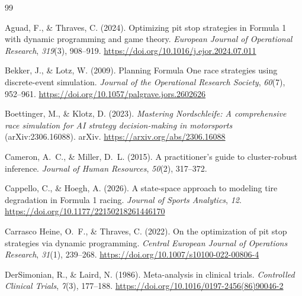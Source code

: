 \begin{thebibliography}{99}


Aguad, F., \& Thraves, C. (2024). Optimizing pit stop strategies in Formula 1
with dynamic programming and game theory. \emph{European Journal of
Operational Research}, \emph{319}(3), 908--919.
\url{https://doi.org/10.1016/j.ejor.2024.07.011}

Bekker, J., \& Lotz, W. (2009). Planning Formula One race strategies using
discrete-event simulation. \emph{Journal of the Operational Research Society},
\emph{60}(7), 952--961.
\url{https://doi.org/10.1057/palgrave.jors.2602626}

Boettinger, M., \& Klotz, D. (2023). \emph{Mastering Nordschleife: A
comprehensive race simulation for AI strategy decision-making in motorsports}
(arXiv:2306.16088). arXiv. \url{https://arxiv.org/abs/2306.16088}

Cameron, A.~C., \& Miller, D.~L. (2015). A practitioner's guide to
cluster-robust inference. \emph{Journal of Human Resources}, \emph{50}(2),
317--372.

Cappello, C., \& Hoegh, A. (2026). A state-space approach to modeling tire
degradation in Formula 1 racing. \emph{Journal of Sports Analytics},
\emph{12}. \url{https://doi.org/10.1177/22150218261446170}

Carrasco Heine, O.~F., \& Thraves, C. (2022). On the optimization of pit stop
strategies via dynamic programming. \emph{Central European Journal of
Operations Research}, \emph{31}(1), 239--268.
\url{https://doi.org/10.1007/s10100-022-00806-4}

DerSimonian, R., \& Laird, N. (1986). Meta-analysis in clinical trials.
\emph{Controlled Clinical Trials}, \emph{7}(3), 177--188.
\url{https://doi.org/10.1016/0197-2456(86)90046-2}


\end{thebibliography}
